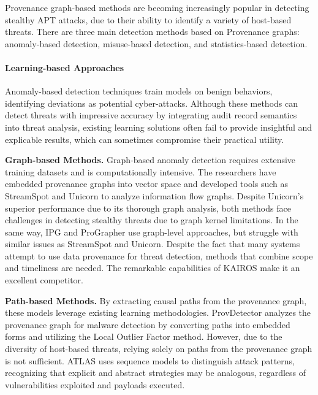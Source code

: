 





Provenance graph-based methods are becoming increasingly popular in detecting stealthy APT attacks, due to their ability to identify a variety of host-based threats. There are three main detection methods based on Provenance graphs: anomaly-based detection, misuse-based detection, and statistics-based detection.

\paragraph{Learning-based Approaches}
Anomaly-based detection techniques train models on benign behaviors, identifying deviations as potential cyber-attacks. Although these methods can detect threats with impressive accuracy by integrating audit record semantics into threat analysis, existing learning solutions often fail to provide insightful and explicable results, which can sometimes compromise their practical utility.

\noindent
{\bf Graph-based Methods.} Graph-based anomaly detection requires extensive training datasets and is computationally intensive. The researchers have embedded provenance graphs into vector space and developed tools such as StreamSpot \cite{manzoor2016fast} and Unicorn \cite{han2020unicorn} to analyze information flow graphs. Despite Unicorn's superior performance due to its thorough graph analysis, both methods face challenges in detecting stealthy threats due to graph kernel limitations. In the same way, IPG \cite{li2021hierarchical} and ProGrapher \cite{yang2023prographer} use graph-level approaches, but struggle with similar issues as StreamSpot and Unicorn. Despite the fact that many systems attempt to use data provenance for threat detection, methods that combine scope and timeliness are needed. The remarkable capabilities of KAIROS \cite{cheng2023kairos} make it an excellent competitor.

\noindent
{\bf Path-based Methods.} By extracting causal paths from the provenance graph, these models leverage existing learning methodologies. ProvDetector \cite{wang2020you} analyzes the provenance graph for malware detection by converting paths into embedded forms and utilizing the Local Outlier Factor method. However, due to the diversity of host-based threats, relying solely on paths from the provenance graph is not sufficient. ATLAS \cite{alsaheel2021atlas}uses sequence models to distinguish attack patterns, recognizing that explicit and abstract strategies may be analogous, regardless of vulnerabilities exploited and payloads executed.

